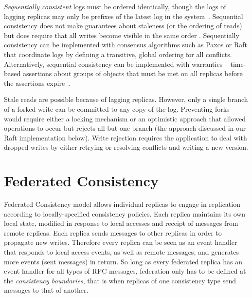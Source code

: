 \documentclass[10pt,conference,letterpaper]{IEEEtran}
\begin{document}
\emph{Sequentially consistent} logs must be ordered identically, though the logs of
lagging replicas may only be prefixes of the latest log in the system~\cite{attiya_sequential_1994}.
Sequential consistency does not make guarantees about staleness
(or the ordering of reads) but does require that all writes become visible in the same
order \cite{bermbach_consistency_2013}.
Sequentially consistency can be implemented with consensus algorithms such as Paxos
\cite{lamport_fast_2006} or Raft \cite{ongaro_search_2014} that coordinate logs by
defining a transitive, global ordering for all conflicts.
Alternatively, sequential consistency can be implemented with warranties -- time-based
assertions about groups of objects that must be met on all replicas before the assertions
expire~\cite{liu_warranties_2014}.

Stale reads are possible because of lagging replicas.
However, only a single branch of a forked write can be committed to any copy of the log.
Preventing forks would require either a locking mechanism or an optimistic approach that
allowed operations to occur but rejects all but one branch (the approach discussed in our
Raft implementation below).
Write rejection requires the application to deal with dropped writes by either retrying or
resolving conflicts and writing a new version.

\section{Federated Consistency}

Federated Consistency model allows individual replicas to
engage in replication according to locally-specified consistency policies.
Each replica maintains its own local state, modified in response to local accesses
and receipt of messages from remote replicas.
Each replica sends messages to other replicas in order to propagate new writes.
Therefore every replica can be seen as an event handler that responds to local access
events, as well as remote messages, and generates more events (sent messages) in return.
So long as every federated replica has an event handler for all types of RPC
messages, federation only has to be defined at the \textit{consistency boundaries}, that
is when replicas of one consistency type send messages to that of another.

\end{document}
